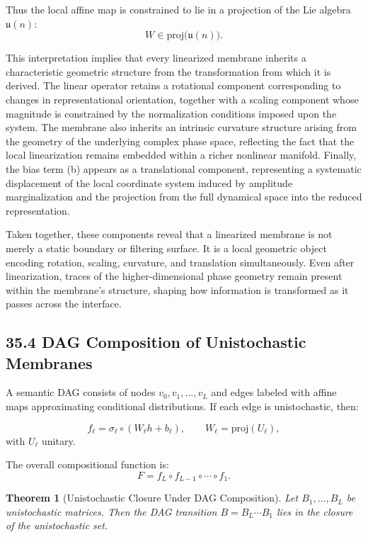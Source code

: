 \documentclass[12pt,letterpaper]{article}
\newtheorem{theorem}{Theorem}[section]
\theoremstyle{remark}
\begin{document}
Thus the local affine map is constrained to lie in a projection of the Lie algebra $\mathfrak{u}(n)$:
\[
W \in \mathrm{proj}\big(\mathfrak{u}(n)\big).
\]

This interpretation implies that every linearized membrane inherits a characteristic geometric structure from the transformation from which it is derived. The linear operator retains a rotational component corresponding to changes in representational orientation, together with a scaling component whose magnitude is constrained by the normalization conditions imposed upon the system. The membrane also inherits an intrinsic curvature structure arising from the geometry of the underlying complex phase space, reflecting the fact that the local linearization remains embedded within a richer nonlinear manifold. Finally, the bias term (b) appears as a translational component, representing a systematic displacement of the local coordinate system induced by amplitude marginalization and the projection from the full dynamical space into the reduced representation.

Taken together, these components reveal that a linearized membrane is not merely a static boundary or filtering surface. It is a local geometric object encoding rotation, scaling, curvature, and translation simultaneously. Even after linearization, traces of the higher-dimensional phase geometry remain present within the membrane's structure, shaping how information is transformed as it passes across the interface.

\subsection{35.4 DAG Composition of Unistochastic Membranes}

A semantic DAG consists of nodes $v_0, v_1, \dots, v_L$ and edges labeled with affine maps approximating conditional distributions. If each edge is unistochastic, then:

\[
f_\ell = \sigma_\ell \circ (W_\ell h + b_\ell), \qquad
W_\ell = \mathrm{proj}(U_\ell),
\]
with $U_\ell$ unitary.

The overall compositional function is:
\[
F = f_L \circ f_{L-1} \circ \cdots \circ f_1.
\]

\begin{theorem}[Unistochastic Closure Under DAG Composition]
Let $B_1, \dots, B_L$ be unistochastic matrices.  
Then the DAG transition $B = B_L \cdots B_1$ lies in the closure of the unistochastic set.
\end{theorem}
\end{document}
